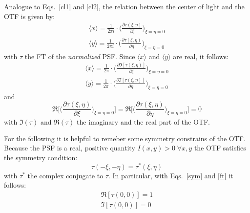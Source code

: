 Analogue to Eqs.~\ref{cl1} and \ref{cl2}, the relation between the center of light and the OTF is given by:
\begin{eqnarray}
\langle x \rangle = \frac{1}{2\pi i} \cdot \Big(\frac{\partial \tau(\xi, \eta)}{\partial \xi}\Big)_{\xi = \eta = 0} \\
\langle y \rangle = \frac{1}{2\pi i} \cdot \Big(\frac{\partial \tau(\xi, \eta)}{\partial \eta}\Big)_{\xi = \eta = 0}
\end{eqnarray}
with $\tau$ the FT of the {\it normalized} PSF. Since $\langle x \rangle$ and $\langle y \rangle$ are real, it follows:
\begin{eqnarray}
\langle x \rangle = \frac{1}{2\pi} \cdot \Big(\frac{\partial \Im[\tau(\xi, \eta)]}{\partial \xi}\Big)_{\xi = \eta = 0} \\
\langle y \rangle = \frac{1}{2\pi} \cdot \Big(\frac{\partial \Im[\tau(\xi, \eta)]}{\partial \eta}\Big)_{\xi = \eta = 0}
\end{eqnarray}
and
\begin{equation}\label{con1}
\Re\Bigg[\Big(\frac{\partial \tau(\xi, \eta)}{\partial \xi}\Big)_{\xi = \eta = 0}\Bigg] = \Re\Bigg[\Big(\frac{\partial \tau(\xi, \eta)}{\partial \eta}\Big)_{\xi = \eta = 0}\Bigg] = 0
\end{equation}
with $\Im(\tau)$ and $\Re(\tau)$ the imaginary and the real part of the OTF.

For the following it is helpful to remeber some symmetry constrains of the OTF.
Because the PSF is a real, positive quantity $I(x,y) > 0 \; \forall x,y$ the OTF satisfies the symmetry condition:
\begin{equation}\label{sym}
\tau(-\xi, -\eta) = \tau^{\ast}(\xi,\eta)
\end{equation}
with $\tau^{\ast}$ the complex conjugate to $\tau$. In particular, with Eqs.~\ref{sym} and \ref{ft} it follows:
\begin{eqnarray}
\Re[\tau(0,0)] = 1 \\
\Im[\tau(0,0)] = 0 \label{con2}
\end{eqnarray}

